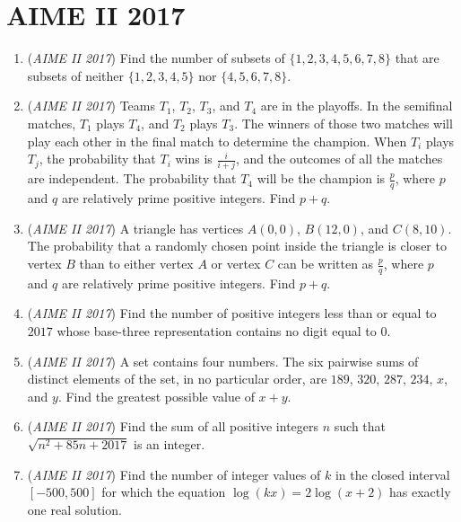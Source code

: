 \section{AIME II 2017}
        \begin{enumerate}
        	\item (\textit{AIME II 2017}) Find the number of subsets of $\{1, 2, 3, 4, 5, 6, 7, 8\}$ that are subsets of neither $\{1, 2, 3, 4, 5\}$ nor $\{4, 5, 6, 7, 8\}$.


 

	\item (\textit{AIME II 2017}) Teams $T_1$, $T_2$, $T_3$, and $T_4$ are in the playoffs. In the semifinal matches, $T_1$ plays $T_4$, and $T_2$ plays $T_3$. The winners of those two matches will play each other in the final match to determine the champion. When $T_i$ plays $T_j$, the probability that $T_i$ wins is $\frac{i}{i+j}$, and the outcomes of all the matches are independent. The probability that $T_4$ will be the champion is $\frac{p}{q}$, where $p$ and $q$ are relatively prime positive integers. Find $p+q$.


 

	\item (\textit{AIME II 2017}) A triangle has vertices $A(0,0)$, $B(12,0)$, and $C(8,10)$. The probability that a randomly chosen point inside the triangle is closer to vertex $B$ than to either vertex $A$ or vertex $C$ can be written as $\frac{p}{q}$, where $p$ and $q$ are relatively prime positive integers. Find $p+q$.


 

	\item (\textit{AIME II 2017}) Find the number of positive integers less than or equal to $2017$ whose base-three representation contains no digit equal to $0$.


 

	\item (\textit{AIME II 2017}) A set contains four numbers. The six pairwise sums of distinct elements of the set, in no particular order, are $189$, $320$, $287$, $234$, $x$, and $y$. Find the greatest possible value of $x+y$.


 

	\item (\textit{AIME II 2017}) Find the sum of all positive integers $n$ such that $\sqrt{n^2+85n+2017}$ is an integer.


 

	\item (\textit{AIME II 2017}) Find the number of integer values of $k$ in the closed interval $[-500,500]$ for which the equation $\log(kx)=2\log(x+2)$ has exactly one real solution.



\end{enumerate}
